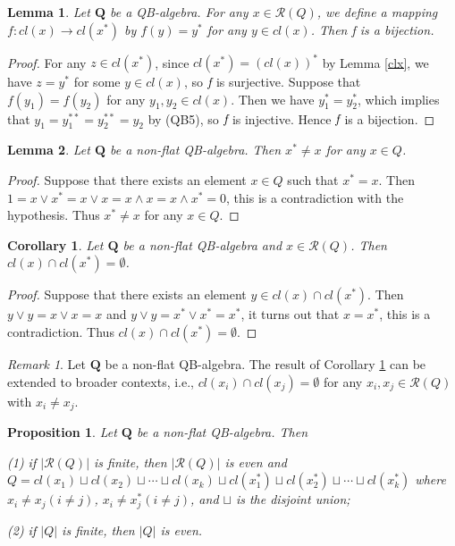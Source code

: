 \documentclass[12pt]{amsart}
\newtheorem{corollary}{Corollary}[section]
\newtheorem{lemma}{Lemma}[section]
\newtheorem{proposition}{Proposition}[section]
\theoremstyle{definition}
\theoremstyle{remark}
\newtheorem{remark}{Remark}[section]
\numberwithin{equation}{section}
\begin{document}
\begin{lemma}\label{bijection}
Let $\mathbf{Q}$ be a QB-algebra. For any $x\in \mathscr{R}(Q)$, we define a mapping $f: cl(x) \rightarrow cl(x^{\ast})$ by $f(y)=y^{\ast}$ for any $y\in cl(x)$. Then f is a bijection.
\end{lemma}

\begin{proof}
For any $z \in cl(x^{\ast})$, since $cl(x^{\ast})=(cl(x))^{\ast}$ by Lemma \ref{clx}, we have $z=y^{\ast}$ for some $y\in cl(x)$, so $\emph{f}$ is surjective. Suppose that $f(y_{1})=f(y_{2})$ for any $y_{1},y_{2}\in cl(x)$. Then we have $y_{1}^{\ast}=y_{2}^{\ast}$, which implies that $y_{1}=y_{1}^{\ast\ast}=y_{2}^{\ast\ast}=y_{2}$ by (QB5), so $\emph{f}$ is injective. Hence $\emph{f}$ is a bijection.
\end{proof}

\begin{lemma}\label{neq}
Let $\mathbf{Q}$ be a non-flat QB-algebra. Then $x^{\ast}\neq x$ for any $x\in Q$.
\end{lemma}

\begin{proof}
Suppose that there exists an element $x\in Q$ such that $x^{\ast}=x$. Then $1=x\vee x^{\ast}=x\vee x=x\wedge x=x\wedge x^{\ast}=0$, this is a contradiction with the hypothesis. Thus $x^{\ast}\neq x$ for any $x\in Q$.
\end{proof}

\begin{corollary}\label{cor empty}
Let $\mathbf{Q}$ be a non-flat QB-algebra and $x\in \mathscr{R}(Q)$. Then $cl(x)\cap cl(x^{\ast})=\emptyset$.
\end{corollary}

\begin{proof}
Suppose that there exists an element $y\in cl(x)\cap cl(x^{\ast})$. Then $y\vee y=x\vee x=x$ and $y\vee y=x^{\ast}\vee x^{\ast}=x^{\ast}$, it turns out that $x=x^{\ast}$, this is a contradiction. Thus $cl(x)\cap cl(x^{\ast})=\emptyset$.
\end{proof}

\begin{remark}
Let $\mathbf{Q}$ be a non-flat QB-algebra. The result of Corollary \ref{cor empty} can be extended to broader contexts, i.e., $cl(x_{i})\cap cl(x_{j})=\emptyset$ for any $x_{i},x_{j}\in \mathscr{R}(Q)$ with $x_{i}\neq x_{j}$.
\end{remark}

\begin{proposition}\label{non flat number}
Let $\mathbf{Q}$ be a non-flat QB-algebra. Then

\emph{(1)} if $|\mathscr{R}(Q)|$ is finite, then $|\mathscr{R}(Q)|$ is even and $Q=cl(x_{1})\sqcup cl(x_{2})\sqcup \cdots \sqcup cl(x_{k})\sqcup cl(x_{1}^{\ast})\sqcup cl(x_{2}^{\ast})\sqcup \cdots \sqcup cl(x_{k}^{\ast})$ where $x_{i}\neq x_{j}$$(i\neq j)$, $x_{i}\neq x_{j}^{\ast}$$(i\neq j)$, and $\sqcup$ is the disjoint union;

\emph{(2)} if $|Q|$ is finite, then $|Q|$ is even.
\end{proposition}
\end{document}

